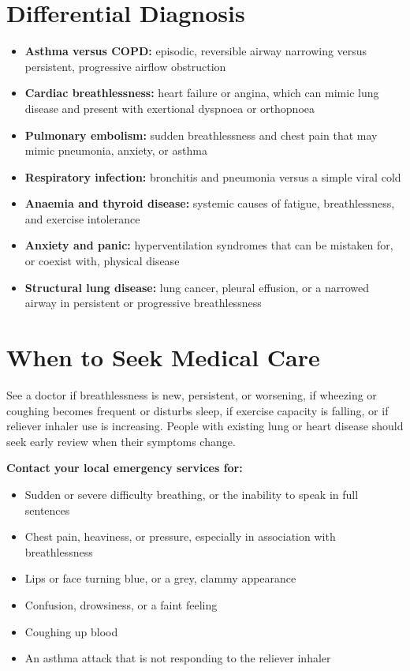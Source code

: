 \section*{Differential Diagnosis}
\begin{itemize}
    \item \textbf{Asthma versus COPD:} episodic, reversible airway narrowing versus persistent, progressive airflow obstruction
    \item \textbf{Cardiac breathlessness:} heart failure or angina, which can mimic lung disease and present with exertional dyspnoea or orthopnoea
    \item \textbf{Pulmonary embolism:} sudden breathlessness and chest pain that may mimic pneumonia, anxiety, or asthma
    \item \textbf{Respiratory infection:} bronchitis and pneumonia versus a simple viral cold
    \item \textbf{Anaemia and thyroid disease:} systemic causes of fatigue, breathlessness, and exercise intolerance
    \item \textbf{Anxiety and panic:} hyperventilation syndromes that can be mistaken for, or coexist with, physical disease
    \item \textbf{Structural lung disease:} lung cancer, pleural effusion, or a narrowed airway in persistent or progressive breathlessness
\end{itemize}

\section*{When to Seek Medical Care}
See a doctor if breathlessness is new, persistent, or worsening, if wheezing or coughing becomes frequent or disturbs sleep, if exercise capacity is falling, or if reliever inhaler use is increasing. People with existing lung or heart disease should seek early review when their symptoms change.

\textbf{Contact your local emergency services for:}
\begin{itemize}
    \item Sudden or severe difficulty breathing, or the inability to speak in full sentences
    \item Chest pain, heaviness, or pressure, especially in association with breathlessness
    \item Lips or face turning blue, or a grey, clammy appearance
    \item Confusion, drowsiness, or a faint feeling
    \item Coughing up blood
    \item An asthma attack that is not responding to the reliever inhaler
\end{itemize}

